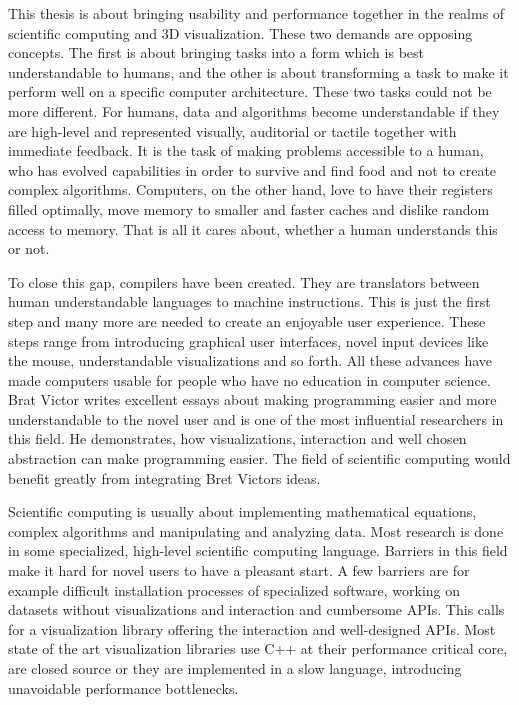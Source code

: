 This thesis is about bringing usability and performance together in the realms of scientific computing and 3D visualization.
These two demands are opposing concepts.
The first is about bringing tasks into a form which is best understandable to humans, and the other is about transforming a task to make it perform well on a specific computer architecture.
These two tasks could not be more different. 
For humans, data and algorithms become understandable if they are high-level and represented visually, auditorial or tactile together with immediate feedback. 
It is the task of making problems accessible to a human, who has evolved capabilities in order to survive and find food and not to create complex algorithms.
Computers, on the other hand, love to have their registers filled optimally, move memory to smaller and faster caches and dislike random access to memory. That is all it cares about, whether a human understands this or not.

To close this gap, compilers have been created. They are translators between human understandable languages to machine instructions.
This is just the first step and many more are needed to create an enjoyable user experience.
These steps range from introducing graphical user interfaces, novel input devices like the mouse, understandable visualizations and so forth.
All these advances have made computers usable for people who have no education in computer science.
Brat Victor writes excellent essays about making programming easier and more understandable to the novel user and is one of the most influential researchers in this field.
He demonstrates, how visualizations, interaction and well chosen abstraction can make programming easier\cite{BretVictorLP}\cite{BretVictorLA}.
The field of scientific computing would benefit greatly from integrating Bret Victors ideas.

Scientific computing is usually about implementing mathematical equations, complex algorithms and manipulating and analyzing data.
Most research is done in some specialized, high-level scientific computing language\cite{DBLP:journals/corr/abs-1209-5145}.
Barriers in this field make it hard for novel users to have a pleasant start.
A few barriers are for example difficult installation processes of specialized software, working on datasets without visualizations and interaction and cumbersome \ac{API}s.
This calls for a visualization library offering the interaction and well-designed \ac{API}s.
Most state of the art visualization libraries use C++ at their performance critical core, are closed source or they are implemented in a slow language, introducing unavoidable performance bottlenecks.

